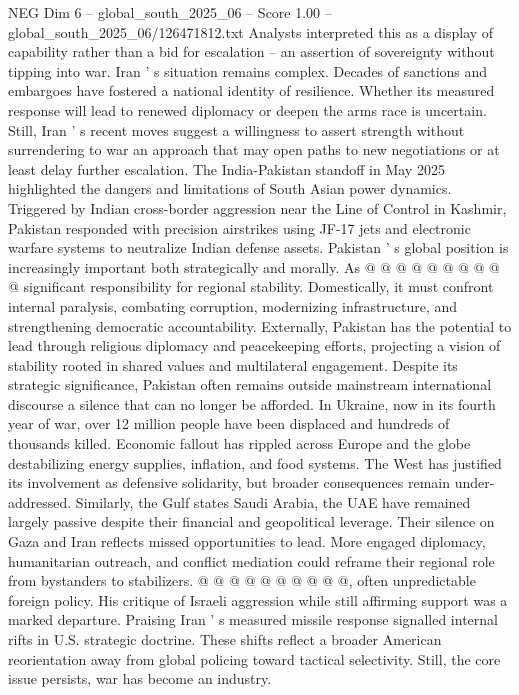 \begin{textsample}{NEG Dim 6 – global\_south\_2025\_06 – Score 1.00 – global\_south\_2025\_06/126471812.txt}
Analysts interpreted this as a display of capability rather than a bid for escalation -- an assertion of sovereignty without tipping into war.
Iran ' s situation remains complex.
Decades of sanctions and embargoes have fostered a national identity of resilience.
Whether its measured response will lead to renewed diplomacy or deepen the arms race is uncertain.
Still, Iran ' s recent moves suggest a willingness to assert strength without surrendering to war an approach that may open paths to new negotiations or at least delay further escalation.
The India-Pakistan standoff in May 2025 highlighted the dangers and limitations of South Asian power dynamics.
Triggered by Indian cross-border aggression near the Line of Control in Kashmir, Pakistan responded with precision airstrikes using JF-17 jets and electronic warfare systems to neutralize Indian defense assets.
Pakistan ' s global position is increasingly important both strategically and morally.
As @ @ @ @ @ @ @ @ @ @ significant responsibility for regional stability.
Domestically, it must confront internal paralysis, combating corruption, modernizing infrastructure, and strengthening democratic accountability.
Externally, Pakistan has the potential to lead through religious diplomacy and peacekeeping efforts, projecting a vision of stability rooted in shared values and multilateral engagement.
Despite its strategic significance, Pakistan often remains outside mainstream international discourse a silence that can no longer be afforded.
In Ukraine, now in its fourth year of war, over 12 million people have been displaced and hundreds of thousands killed.
Economic fallout has rippled across Europe and the globe destabilizing energy supplies, inflation, and food systems.
The West has justified its involvement as defensive solidarity, but broader consequences remain under-addressed.
Similarly, the Gulf states Saudi Arabia, the UAE have remained largely passive despite their financial and geopolitical leverage.
Their silence on Gaza and Iran reflects missed opportunities to lead.
More engaged diplomacy, humanitarian outreach, and conflict mediation could reframe their regional role from bystanders to stabilizers. @ @ @ @ @ @ @ @ @ @, often unpredictable foreign policy.
His critique of Israeli aggression while still affirming support was a marked departure.
Praising Iran ' s measured missile response signalled internal rifts in U.S. strategic doctrine.
These shifts reflect a broader American reorientation away from global policing toward tactical selectivity.
Still, the core issue persists, war has become an industry.

\end{textsample}
